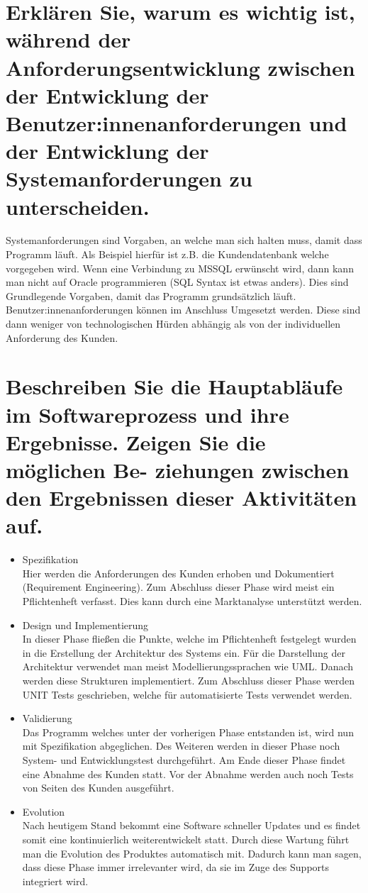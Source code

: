 \documentclass[12pt]{article}
\begin{document}
\section{Erklären Sie, warum es wichtig ist, während der Anforderungsentwicklung zwischen der Entwicklung der
Benutzer:innenanforderungen und der Entwicklung der Systemanforderungen zu unterscheiden.}
Systemanforderungen sind Vorgaben, an welche man sich halten muss, damit dass Programm läuft. Als Beispiel hierfür ist z.B. die Kundendatenbank welche vorgegeben wird. Wenn eine Verbindung zu MSSQL erwünscht wird, dann kann man nicht auf Oracle programmieren (SQL Syntax ist etwas anders). Dies sind Grundlegende Vorgaben, damit das Programm grundsätzlich läuft. Benutzer:innenanforderungen können im Anschluss Umgesetzt werden. Diese sind dann weniger von technologischen Hürden abhängig als von der individuellen Anforderung des Kunden.

\section{Beschreiben Sie die Hauptabläufe im Softwareprozess und ihre Ergebnisse. Zeigen Sie die möglichen Be-
ziehungen zwischen den Ergebnissen dieser Aktivitäten auf.}
\begin{itemize}
 \item Spezifikation\\
 Hier werden die Anforderungen des Kunden erhoben und Dokumentiert (Requirement Engineering). Zum Abschluss dieser Phase wird meist ein Pflichtenheft verfasst. Dies kann durch eine Marktanalyse unterstützt werden.
 \item Design und Implementierung\\
 In dieser Phase fließen die Punkte, welche im Pflichtenheft festgelegt wurden in die Erstellung der Architektur des Systems ein. Für die Darstellung der Architektur verwendet man meist Modellierungssprachen wie UML. Danach werden diese Strukturen implementiert. Zum Abschluss dieser Phase werden UNIT Tests geschrieben, welche für automatisierte Tests verwendet werden.
 \item Validierung\\
 Das Programm welches unter der vorherigen Phase entstanden ist, wird nun mit Spezifikation abgeglichen. Des Weiteren werden in dieser Phase noch System- und Entwicklungstest durchgeführt. Am Ende dieser Phase findet eine Abnahme des Kunden statt. Vor der Abnahme werden auch noch Tests von Seiten des Kunden ausgeführt.
 \item Evolution\\
 Nach heutigem Stand bekommt eine Software schneller Updates und es findet somit eine kontinuierlich weiterentwickelt statt. Durch diese Wartung führt man die Evolution des Produktes automatisch mit. Dadurch kann man sagen, dass diese Phase immer irrelevanter wird, da sie im Zuge des Supports integriert wird.
\end{itemize}
\pagebreak
\end{document}
